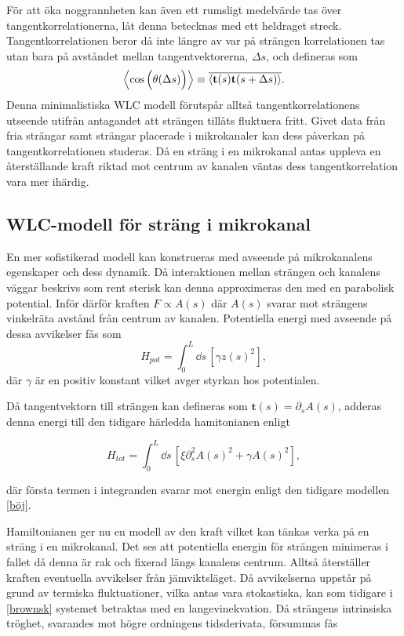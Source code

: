 För att öka noggrannheten kan även ett rumsligt medelvärde tas över tangentkorrelationerna, låt denna betecknas med ett heldraget streck. Tangentkorrelationen beror då inte längre av var på strängen korrelationen tas utan bara på avståndet mellan tangentvektorerna, $\Delta s$, och defineras som
\begin{equation}
\label{tangkorr}
    \ev{ \cos\Big(\theta(\Delta s)\Big)}\equiv\overline{\ev{\mathbf{t}(s)\mathbf{t}(s+\Delta s)}}.
\end{equation}
Denna minimalistiska WLC modell förutspår alltså tangentkorrelationens utseende utifrån antagandet att strängen tillåts fluktuera fritt. Givet data från fria strängar samt strängar placerade i mikrokanaler kan dess påverkan på tangentkorrelationen studeras. Då en sträng i en mikrokanal antas uppleva en återställande kraft riktad mot centrum av kanalen väntas dess tangentkorrelation vara mer ihärdig.

\subsection{WLC-modell för sträng i mikrokanal}

En mer sofistikerad modell kan konstrueras med avseende på mikrokanalens egenskaper och dess dynamik. Då interaktionen mellan strängen och kanalens väggar beskrivs som rent sterisk \cite{Koster_etal2007} kan denna approximeras den med en parabolisk potential. Inför därför kraften $F \propto A(s)$ där $A(s)$ svarar mot strängens vinkelräta avstånd från centrum av kanalen. Potentiella energi med avseende på dessa avvikelser fås som
\begin{equation}
    H_{pot}=\int_{0}^{L} \!\dd{s} \, [\gamma z(s)^2],
\end{equation}
där $\gamma$ är en positiv konstant vilket avger styrkan hos potentialen. 

Då tangentvektorn till strängen kan defineras som $\mathbf{t}(s)=\partial_sA(s)$, adderas denna energi till den tidigare härledda hamitonianen enligt

\begin{equation}
\label{Htot}
    H_{tot}=\int_{0}^{L}\!\dd{s}\,[\xi\partial_{s}^{2}A(s)^2 + \gamma A(s)^2],
\end{equation}

där första termen i integranden svarar mot energin enligt den tidigare modellen \eqref{böj}.

Hamiltonianen ger nu en modell av den kraft vilket kan tänkas verka på en sträng i en mikrokanal. Det ses att potentiella energin för strängen minimeras i fallet då denna är rak och fixerad längs kanalens centrum. Alltså återställer kraften eventuella avvikelser från jämviktsläget. Då avvikelserna uppstår på grund av termiska fluktuationer, vilka antas vara stokastiska, kan som tidigare i \ref{brownsk} systemet betraktas med en langevinekvation. Då strängens intrinsiska tröghet, svarandes mot högre ordningens tidsderivata, försummas fås\cite{PhysRevE.60.4671}

